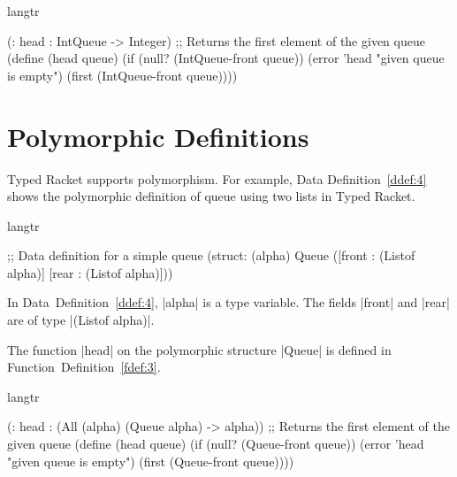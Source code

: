 
\begin{example}
\begin{schemedisplay}
  langtr

  (: head : IntQueue -> Integer)
  ;; Returns the first element of the given queue
  (define (head queue)
    (if (null? (IntQueue-front queue))
        (error 'head "given queue is empty")
        (first (IntQueue-front queue))))

\end{schemedisplay}
\label{fdef:2}
\end{example}



\section{Polymorphic Definitions}

Typed Racket supports polymorphism. For example, Data
Definition~\ref{ddef:4} shows the polymorphic definition of queue using
two lists in Typed Racket.

\begin{defexample}
\begin{schemedisplay}
  langtr

  ;; Data definition for a simple queue
  (struct: (alpha) Queue
    ([front : (Listof alpha)]
     [rear  : (Listof alpha)]))

\end{schemedisplay}
\label{ddef:4}
\end{defexample}

\noindent
In Data~Definition~\ref{ddef:4}, \scheme|alpha| is a type variable. The
fields \scheme|front| and \scheme|rear| are of type \scheme|(Listof
alpha)|.

The function \scheme|head| on the polymorphic structure \scheme|Queue|
is defined in Function~Definition~\ref{fdef:3}.

\begin{example}
\begin{schemedisplay}
  langtr

  (: head : (All (alpha) (Queue alpha) -> alpha))
  ;; Returns the first element of the given queue
  (define (head queue)
    (if (null? (Queue-front queue))
        (error 'head "given queue is empty")
        (first (Queue-front queue))))

\end{schemedisplay}
\label{fdef:3}
\end{example}

